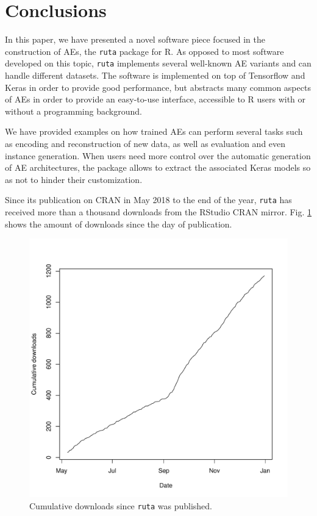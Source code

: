 \documentclass[
	fontsize=11pt, %
	twoside=false, %
	open=any, %
	secnumdepth=1, %
]{kaobook}
\newcommand{\revised}[1]{#1}
\newcommand{\revisedtwo}[1]{#1}
\begin{document}


\section{Conclusions}
\label{sec.conclusions}


In this paper, we have presented a novel software piece focused in the construction of AEs, the \texttt{ruta} package for R. As opposed to most software developed on this topic, \texttt{ruta} implements several well-known AE variants and can handle different datasets. The software is implemented on top of Tensorflow and Keras in order to provide good performance\revised{, but abstracts many common aspects of AEs in order to provide an easy-to-use interface, accessible to R users with or without a programming background}.

We have provided examples on how trained AEs can perform several tasks such as encoding and reconstruction of new data, as well as evaluation and even instance generation. \revisedtwo{When users need more control over the automatic generation of AE architectures, the package allows to extract the associated Keras models so as not to hinder their customization.}

\revisedtwo{Since its publication on CRAN in May 2018 to the end of the year, \texttt{ruta} has received more than a thousand downloads from the RStudio CRAN mirror. Fig. \ref{fig.downloads} shows the amount of downloads since the day of publication.}

\begin{figure}[ht]
  \centering
  \includegraphics[width=.5\textwidth]{ruta_downloads.pdf}
  \caption{\label{fig.downloads}Cumulative downloads since \texttt{ruta} was published.}
\end{figure}
\end{document}
